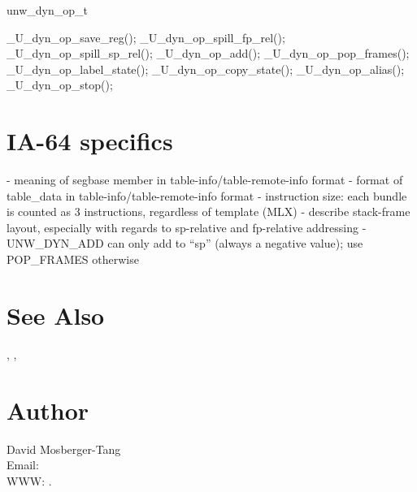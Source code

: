 \documentclass{article}
\begin{document}
unw\_dyn\_op\_t

\_U\_dyn\_op\_save\_reg();
\_U\_dyn\_op\_spill\_fp\_rel();
\_U\_dyn\_op\_spill\_sp\_rel();
\_U\_dyn\_op\_add();
\_U\_dyn\_op\_pop\_frames();
\_U\_dyn\_op\_label\_state();
\_U\_dyn\_op\_copy\_state();
\_U\_dyn\_op\_alias();
\_U\_dyn\_op\_stop();

\section{IA-64 specifics}

- meaning of segbase member in table-info/table-remote-info format
- format of table\_data in table-info/table-remote-info format
- instruction size: each bundle is counted as 3 instructions, regardless
  of template (MLX)
- describe stack-frame layout, especially with regards to sp-relative
  and fp-relative addressing
- UNW\_DYN\_ADD can only add to ``sp'' (always a negative value); use
  POP\_FRAMES otherwise

\section{See Also}

,
,

\section{Author}

\noindent
David Mosberger-Tang\\
Email: \\
WWW: .
\LatexManEnd
\end{document}
